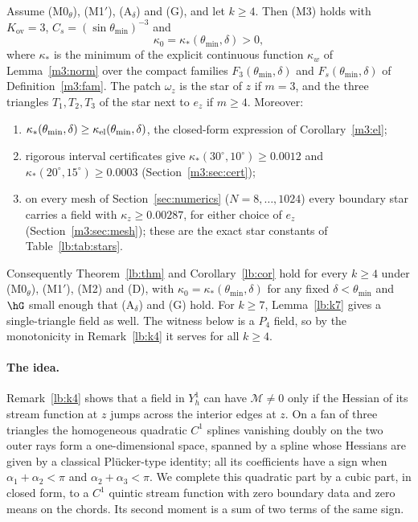 \begin{theorem}\label{m3:thm}
Assume (M0$_\theta$), (M1$'$), (A$_\delta$) and (G), and let $k\ge4$. Then (M3) holds with $K_{\mathrm{ov}}=3$, $C_s=(\sin\theta_{\min})^{-3}$ and
\[
\kappa_0=\kappa_\ast(\theta_{\min},\delta)>0,
\]
where $\kappa_\ast$ is the minimum of the explicit continuous function $\kappa_w$ of Lemma~\ref{m3:norm} over the compact families $F_3(\theta_{\min},\delta)$ and $F_s(\theta_{\min},\delta)$ of Definition~\ref{m3:fam}. The patch $\omega_z$ is the star of $z$ if $m=3$, and the three triangles $T_1,T_2,T_3$ of the star next to $e_z$ if $m\ge4$. Moreover:
\begin{enumerate}[label=(\alph*)]
\item $\kappa_\ast(\theta_{\min},\delta)\ge\kappa_{\rm el}(\theta_{\min},\delta)$, the closed-form expression of Corollary~\ref{m3:el};
\item rigorous interval certificates give $\kappa_\ast(30^\circ,10^\circ)\ge0.0012$ and $\kappa_\ast(20^\circ,15^\circ)\ge0.0003$ (Section~\ref{m3:sec:cert});
\item on every mesh of Section~\ref{sec:numerics} ($N=8,\dots,1024$) every boundary star carries a field with $\kappa_z\ge0.00287$, for either choice of $e_z$ (Section~\ref{m3:sec:mesh}); these are the exact star constants of Table~\ref{lb:tab:stars}.
\end{enumerate}
\end{theorem}

Consequently Theorem~\ref{lb:thm} and Corollary~\ref{lb:cor} hold for every $k\ge4$ under (M0$_\theta$), (M1$'$), (M2) and (D), with $\kappa_0=\kappa_\ast(\theta_{\min},\delta)$ for any fixed $\delta<\theta_{\min}$ and $\hG$ small enough that (A$_\delta$) and (G) hold. For $k\ge7$, Lemma~\ref{lb:k7} gives a single-triangle field as well. The witness below is a $P_4$ field, so by the monotonicity in Remark~\ref{lb:k4} it serves for all $k\ge4$.

\paragraph{The idea.} Remark~\ref{lb:k4} shows that a field in $Y_h^1$ can have $\mathcal M\ne0$ only if the Hessian of its stream function at $z$ jumps across the interior edges at $z$. On a fan of three triangles the homogeneous quadratic $C^1$ splines vanishing doubly on the two outer rays form a one-dimensional space, spanned by a spline whose Hessians are given by a classical Pl\"ucker-type identity; all its coefficients have a sign when $\alpha_1+\alpha_2<\pi$ and $\alpha_2+\alpha_3<\pi$. We complete this quadratic part by a cubic part, in closed form, to a $C^1$ quintic stream function with zero boundary data and zero means on the chords. Its second moment is a sum of two terms of the same sign.

